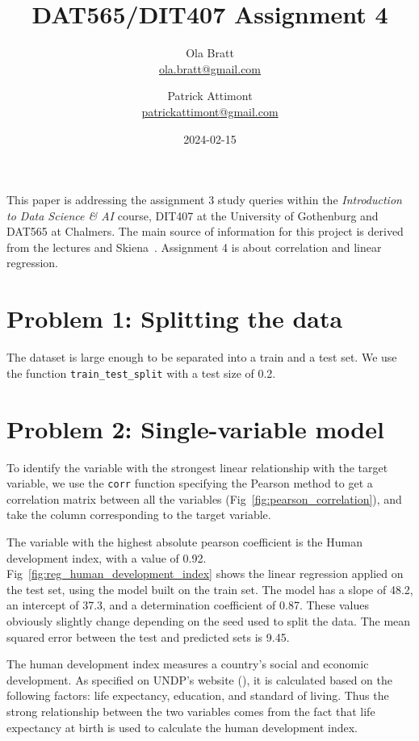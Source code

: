 \documentclass[a4paper]{article}
\begin{document}
\author{Ola Bratt \\
  \href{mailto:ola.bratt@gmail.com}{ola.bratt@gmail.com}
  \and
  Patrick Attimont \\
  \href{patrickattimont@gmail.com}{patrickattimont@gmail.com}
}

\title{DAT565/DIT407 Assignment 4}
\date{2024-02-15}

\maketitle

This paper is addressing the assignment 3 study queries within the \emph{Introduction to Data Science \& AI} course, DIT407 at 
the University of Gothenburg and DAT565 at Chalmers. The main source of information for this project
is derived from the lectures and Skiena~\cite{Skiena:2024}. Assignment 4 is about correlation and linear regression.

\section*{Problem 1: Splitting the data}
The dataset is large enough to be separated into a train and a test set. We use the function \verb|train_test_split| with a test size of 0.2.


\section*{Problem 2: Single-variable model}
To identify the variable with the strongest linear relationship with the target variable, we use the \verb|corr| function specifying the Pearson method to get a correlation matrix between all the variables (Fig~\ref{fig:pearson_correlation}), and take the column corresponding to the target variable.

The variable with the highest absolute pearson coefficient is the Human development index, with a value of 0.92.
Fig~\ref{fig:reg_human_development_index} shows the linear regression applied on the test set, using the model built on the train set.
The model has a slope of 48.2, an intercept of 37.3, and a determination coefficient of 0.87. These values obviously slightly change depending on the seed used to split the data.
The mean squared error between the test and predicted sets is 9.45.

The human development index measures a country's social and economic development. As specified on UNDP's website (\cite{UNDP:2023}), it is calculated based on the following factors: life expectancy, education, and standard of living.
Thus the strong relationship between the two variables comes from the fact that life expectancy at birth is used to calculate the human development index.
\end{document}
